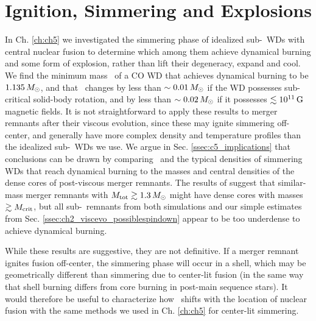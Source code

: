 
\section{Ignition, Simmering and Explosions}

In Ch. \ref{ch:ch5} we investigated the simmering phase of idealized sub-\Mch\ WDs with central nuclear fusion to determine which among them achieve dynamical burning and some form of explosion, rather than lift their degeneracy, expand and cool.  We find the minimum mass \Mcrit\ of a CO WD that achieves dynamical burning to be $1.135\,\Msun$, and that \Mcrit\ changes by less than $\sim0.01\,\Msun$ if the WD possesses sub-critical solid-body rotation, and by less than $\sim0.02\,\Msun$ if it possesses $\lesssim 10^{11}\,\mathrm{G}$ magnetic fields.  It is not straightforward to apply these results to merger remnants after their viscous evolution, since these may ignite simmering off-center, and generally have more complex density and temperature profiles than the idealized sub-\Mch\ WDs we use.  We argue in Sec. \ref{ssec:c5_implications} that conclusions can be drawn by comparing \Mcrit\ and the typical densities of simmering WDs that reach dynamical burning to the masses and central densities of the dense cores of post-viscous merger remnants.  The results of \cite{ji+13} suggest that similar-mass merger remnants with $\Mtot \gtrsim 1.3\,\Msun$ might have dense cores with masses $\gtrsim\Mcrit$, but all sub-\Mch\ remnants from both simulations and our simple estimates from Sec. \ref{ssec:ch2_viscevo_possiblespindown} appear to be too underdense to achieve dynamical burning.  

While these results are suggestive, they are not definitive.  If a merger remnant ignites fusion off-center, the simmering phase will occur in a shell, which may be geometrically different than simmering due to center-lit fusion (in the same way that shell burning differs from core burning in post-main sequence stars).  It would therefore be useful to characterize how \Mcrit\ shifts with the location of nuclear fusion with the same methods we used in Ch. \ref{ch:ch5} for center-lit simmering.

